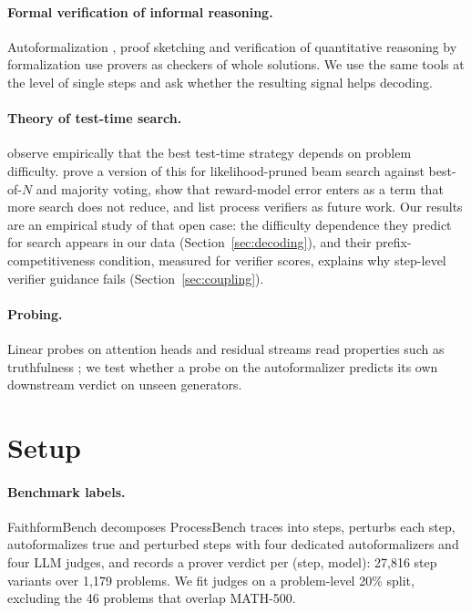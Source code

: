 \documentclass[10pt]{article}
\begin{document}
\paragraph{Formal verification of informal reasoning.} Autoformalization \citep{wu2022autoformalization}, proof sketching \citep{jiang2023dsp} and verification of quantitative reasoning by formalization \citep{zhou2024dtv} use provers as checkers of whole solutions. We use the same tools \citep{lin2025goedel,ren2025deepseekproverv2,wang2025kimina,gao2024herald} at the level of single steps and ask whether the resulting signal helps decoding.
\paragraph{Theory of test-time search.} \citet{snell2024scaling} observe empirically that the best test-time strategy depends on problem difficulty. \citet{he2026provable} prove a version of this for likelihood-pruned beam search against best-of-$N$ and majority voting, show that reward-model error enters as a term that more search does not reduce, and list process verifiers as future work. Our results are an empirical study of that open case: the difficulty dependence they predict for search appears in our data (Section~\ref{sec:decoding}), and their prefix-competitiveness condition, measured for verifier scores, explains why step-level verifier guidance fails (Section~\ref{sec:coupling}).

\paragraph{Probing.} Linear probes on attention heads and residual streams read properties such as truthfulness \citep{li2023iti}; we test whether a probe on the autoformalizer predicts its own downstream verdict on unseen generators.

\section{Setup}\label{sec:setup}

\paragraph{Benchmark labels.} FaithformBench \citep{faithformbench} decomposes ProcessBench traces into steps, perturbs each step, autoformalizes true and perturbed steps with four dedicated autoformalizers and four LLM judges, and records a prover verdict per (step, model): 27{,}816 step variants over 1{,}179 problems. We fit judges on a problem-level 20\% split, excluding the 46 problems that overlap MATH-500.
\end{document}
